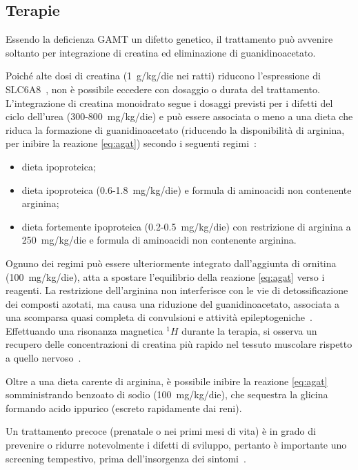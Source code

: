 		\subsection{Terapie}
		Essendo la deficienza GAMT un difetto genetico, il trattamento pu\`o avvenire soltanto per integrazione di creatina ed eliminazione di guanidinoacetato.
		
		Poich\'e alte dosi di creatina (\SI{1}{g/kg/die} nei ratti) riducono l'espressione di SLC6A8~\cite{tarnopolsky2003acute}, non \`e possibile eccedere con dosaggio o durata del trattamento.
		L'integrazione di creatina monoidrato segue i dosaggi previsti per i difetti del ciclo dell'urea (300-\SI{800}{mg/kg/die}) e pu\`o essere associata o meno a una dieta che riduca la formazione di guanidinoacetato (riducendo la disponibilit\`a di arginina, per inibire la reazione \ref{eq:agat}) secondo i seguenti regimi~\cite{stockler2014guanidinoacetate}:
		\begin{itemize}
			\item dieta ipoproteica;
			\item dieta ipoproteica (0.6-\SI{1.8}{mg/kg/die}) e formula di aminoacidi non contenente arginina;
			\item dieta fortemente ipoproteica (0.2-\SI{0.5}{mg/kg/die}) con restrizione di arginina a \SI{250}{mg/kg/die} e formula di aminoacidi non contenente arginina.
		\end{itemize}
		
		Ognuno dei regimi pu\`o essere ulteriormente integrato dall'aggiunta di ornitina (\SI{100}{mg/kg/die}), atta a spostare l'equilibrio della reazione \ref{eq:agat} verso i reagenti.
		La restrizione dell'arginina non interferisce con le vie di detossificazione dei composti azotati, ma causa una riduzione del guanidinoacetato, associata a una scomparsa quasi completa di convulsioni e attivit\`a epileptogeniche~\cite{schulze2001improving}.
		Effettuando una risonanza magnetica $^1H$ durante la terapia, si osserva un recupero delle concentrazioni di creatina pi\`u rapido nel tessuto muscolare rispetto a quello nervoso~\cite{ensenauer2004guanidinoacetate}.
		
		Oltre a una dieta carente di arginina, \`e possibile inibire la reazione \ref{eq:agat} somministrando benzoato di sodio (\SI{100}{mg/kg/die}), che sequestra la glicina formando acido ippurico (escreto rapidamente dai reni).
		
		Un trattamento precoce (prenatale o nei primi mesi di vita) \`e in grado di prevenire o ridurre notevolmente i difetti di sviluppo, pertanto \`e importante uno screening tempestivo, prima dell'insorgenza dei sintomi~\cite{stockler2014guanidinoacetate}.
	
